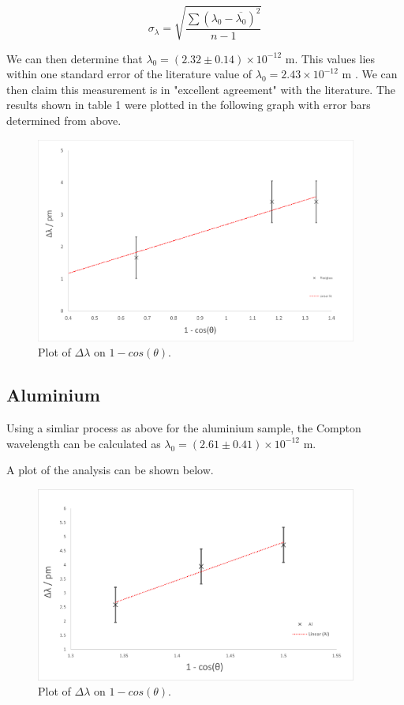 \documentclass{article}%
\begin{document}
\begin{equation}
    \sigma_{\lambda} = \sqrt{\frac{\sum{(\lambda_0 - \overline{\lambda_0})^2}}{n - 1}}
\end{equation}



We can then determine that $\lambda_0 = (2.32 \pm 0.14) \times 10^{-12}$ m. This values lies within one standard error of the literature value of $\lambda_0 = 2.43 \times 10^{-12}$ m \cite{NIST}. We can then claim this measurement is in "excellent agreement" \cite{HH} with the literature.
The results shown in table 1 were plotted in the following graph with error bars determined from above. 

\begin{figure}[H]
    \centering%
    \includegraphics[width=400px]{plexi_graph.png}
    \caption{Plot of $\Delta \lambda$ on $1 - cos(\theta)$.}%
\end{figure}


\subsection{Aluminium}
Using a simliar process as above for the aluminium sample, the Compton wavelength can be calculated as $\lambda_0 = (2.61 \pm 0.41) \times 10^{-12}$ m.

A plot of the analysis can be shown below.
\begin{figure}[H]
    \centering%
    \includegraphics[width=400px]{Al_graph.png}
    \caption{Plot of $\Delta \lambda$ on $1 - cos(\theta)$.}%
\end{figure}
\end{document}
